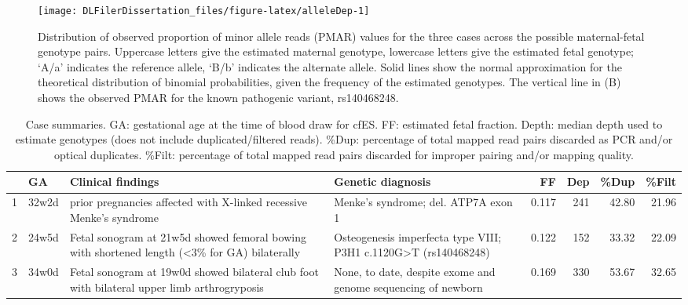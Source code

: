 \documentclass[11pt,letterpaper,oneside]{book}
\begin{document}
\begin{figure}

{\centering \texttt{[image: DLFilerDissertation\_files/figure-latex/alleleDep-1]} 

}

\caption[PMAR distribution for cell-free exome sequencing cases.]{Distribution of observed proportion of minor allele reads (PMAR) values for the three cases across the possible maternal-fetal genotype pairs. Uppercase letters give the estimated maternal genotype, lowercase letters give the estimated fetal genotype; `A/a' indicates the reference allele, `B/b' indicates the alternate allele. Solid lines show the normal approximation for the theoretical distribution of binomial probabilities, given the frequency of the estimated genotypes. The vertical line in (B) shows the observed PMAR for the known pathogenic variant, rs140468248.}\label{fig:alleleDep}
\end{figure}





















\begin{table}

\caption[Cell-free exome sequencing case summaries]{\label{tab:caseSmry}Case summaries. GA: gestational age at the time of blood draw for cfES. FF: estimated fetal fraction. Depth: median depth used to estimate genotypes (does not include duplicated/filtered reads). \%Dup: percentage of total mapped read pairs discarded as PCR and/or optical duplicates. \%Filt: percentage of total mapped read pairs discarded for improper pairing and/or mapping quality.}
\centering
\begin{tabular}[t]{ll>{\raggedright\arraybackslash}p{10em}>{\raggedright\arraybackslash}p{10em}rrrr}
\toprule
  & GA & Clinical findings & Genetic diagnosis & FF & Dep & \%Dup & \%Filt\\
\midrule
1 & 32w2d & 5 prior pregnancies affected with X-linked recessive Menke's syndrome & Menke's syndrome; del. ATP7A exon 1 & 0.117 & 241 & 42.80 & 21.96\\
2 & 24w5d & Fetal sonogram at 21w5d showed femoral bowing with shortened length (\textless3\% for GA) bilaterally & Osteogenesis imperfecta type VIII; P3H1 c.1120G\textgreater T (rs140468248) & 0.122 & 152 & 33.32 & 22.09\\
3 & 34w0d & Fetal sonogram at 19w0d showed bilateral club foot with bilateral upper limb arthrogryposis & None, to date, despite exome and genome sequencing of newborn & 0.169 & 330 & 53.67 & 32.65\\
\bottomrule
\end{tabular}
\end{table}
\end{document}
